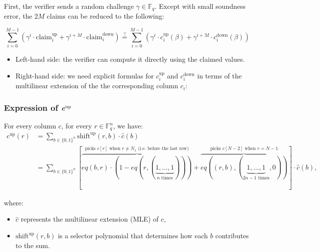 \documentclass{article}
\newcommand{\Fq}{\mathbb F_q}
\begin{document}
First, the verifier sends a random challenge $\gamma \in \Fq$. Except with small soundness error, the $2M$ claims can be reduced to the following:

\begin{equation}\label{eq1}
    \sum_{i = 0}^{M-1} (\gamma^i \cdot \text{claim}^\text{up}_i + \gamma^{i+M} \cdot \text{claim}^\text{down}_i) \stackrel{?}{=} \sum_{i = 0}^{M-1} (\gamma^i \cdot c_i^{\text{up}}(\beta) + \gamma^{i+M} \cdot c_i^{\text{down}}(\beta))
\end{equation}

\begin{itemize}
    \item Left-hand side: the verifier can compute it directly using the claimed values.
    \item Right-hand side: we need explicit formulas for $c_i^{\text{up}}$ and $c_i^{\text{down}}$ in terms of the multilinear extension of the the corresponding column $c_i$:
\end{itemize}


\subsubsection{\texorpdfstring{Expression of $\textbf{\textit{c}}^{\text{up}}$}{}} \label{shifted_mle_up}

For every column $c$, for every $r \in \Fq^n$, we have:
\begin{equation*}
    \begin{aligned}
        c^{\text{up}}(r) &=  \sum_{b \in \{0, 1\}^n}  \text{shift}^{\text{up}}(r, b) \cdot \widehat{c}(b) \\
        &=  \sum_{b \in \{0, 1\}^n} \left[\overbrace{eq(b, r) \cdot (1 - eq(r, (\underbrace{1, \dots, 1}_{n \text{ times}})))}^{\text{picks $c[r]$ when $r \neq N_1$ (i.e. before the last row)}} + \overbrace{eq((r, b), (\underbrace{1, \dots, 1}_{2n - 1 \text{ times}}, 0))}^{\text{picks $c[N - 2]$ when $r=N-1$}}\right] \cdot \widehat{c}(b),
    \end{aligned}
\end{equation*}

where:
\begin{itemize}
    \item $\widehat{c}$ represents the multilinear extension (MLE) of $c$,
    \item $\text{shift}^{\text{up}}(r, b)$ is a selector polynomial that determines how each $b$ contributes to the sum.
\end{itemize}
\end{document}
